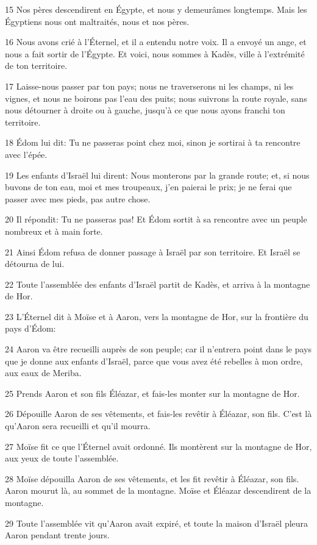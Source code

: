\par 15 Nos pères descendirent en Égypte, et nous y demeurâmes longtemps. Mais les Égyptiens nous ont maltraités, nous et nos pères.
\par 16 Nous avons crié à l'Éternel, et il a entendu notre voix. Il a envoyé un ange, et nous a fait sortir de l'Égypte. Et voici, nous sommes à Kadès, ville à l'extrémité de ton territoire.
\par 17 Laisse-nous passer par ton pays; nous ne traverserons ni les champs, ni les vignes, et nous ne boirons pas l'eau des puits; nous suivrons la route royale, sans nous détourner à droite ou à gauche, jusqu'à ce que nous ayons franchi ton territoire.
\par 18 Édom lui dit: Tu ne passeras point chez moi, sinon je sortirai à ta rencontre avec l'épée.
\par 19 Les enfants d'Israël lui dirent: Nous monterons par la grande route; et, si nous buvons de ton eau, moi et mes troupeaux, j'en paierai le prix; je ne ferai que passer avec mes pieds, pas autre chose.
\par 20 Il répondit: Tu ne passeras pas! Et Édom sortit à sa rencontre avec un peuple nombreux et à main forte.
\par 21 Ainsi Édom refusa de donner passage à Israël par son territoire. Et Israël se détourna de lui.
\par 22 Toute l'assemblée des enfants d'Israël partit de Kadès, et arriva à la montagne de Hor.
\par 23 L'Éternel dit à Moïse et à Aaron, vers la montagne de Hor, sur la frontière du pays d'Édom:
\par 24 Aaron va être recueilli auprès de son peuple; car il n'entrera point dans le pays que je donne aux enfants d'Israël, parce que vous avez été rebelles à mon ordre, aux eaux de Meriba.
\par 25 Prends Aaron et son fils Éléazar, et fais-les monter sur la montagne de Hor.
\par 26 Dépouille Aaron de ses vêtements, et fais-les revêtir à Éléazar, son fils. C'est là qu'Aaron sera recueilli et qu'il mourra.
\par 27 Moïse fit ce que l'Éternel avait ordonné. Ils montèrent sur la montagne de Hor, aux yeux de toute l'assemblée.
\par 28 Moïse dépouilla Aaron de ses vêtements, et les fit revêtir à Éléazar, son fils. Aaron mourut là, au sommet de la montagne. Moïse et Éléazar descendirent de la montagne.
\par 29 Toute l'assemblée vit qu'Aaron avait expiré, et toute la maison d'Israël pleura Aaron pendant trente jours.

